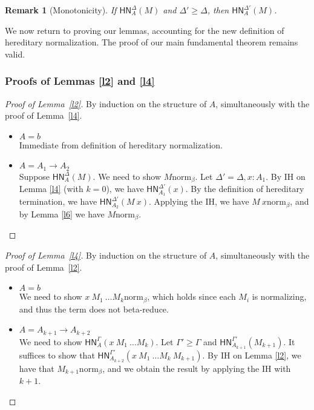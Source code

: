 \documentclass{article}
\newtheorem{remark}[thm]{Remark}
\newcommand{\bnorm}[1]{\ensuremath{#1 \mathrel{\text{norm}_\beta}}}
\newcommand{\hnorm}[3]{\ensuremath{\mathsf{HN}^{#1}_{#2}(#3)}}
\newcommand{\fn}[2]{\ensuremath{#1 \to #2}}
\newcommand{\ap}[2]{\ensuremath{#1\ #2}}
\begin{document}
\begin{remark}[Monotonicity]
If $\hnorm{\Delta}{A}{M}$ and $\Delta' \ge \Delta$, then $\hnorm{\Delta'}{A}{M}$.
\end{remark}

We now return to proving our lemmas, accounting for the new definition of hereditary
normalization.  The proof of our main fundamental theorem remains valid.

\subsubsection{Proofs of Lemmas \ref{l2} and \ref{l4}}

\begin{proof}[Proof of Lemma~\ref{l2}]
By induction on the structure of $A$, simultaneously with the proof of Lemma~\ref{l4}.
\begin{itemize}
  \setlength\itemsep{1em}
  \item $A = b$\\
  Immediate from definition of hereditary normalization.
  \item $A = \fn{A_1}{A_2}$\\
  Suppose $\hnorm{\Delta}{A}{M}$. We need to show $\bnorm{M}$. Let $\Delta' = \Delta, x : A_1$. By IH on Lemma \ref{l4} 
  (with $k = 0$), we have $\hnorm{\Delta'}{A_1}{x}$. By the definition of hereditary termination, we have 
  $\hnorm{\Delta'}{A_2}{\ap{M}{x}}$. Applying the IH, we have $\bnorm{\ap{M}{x}}$, and by Lemma \ref{l6} we have 
  $\bnorm{M}$. 
  \qedhere
\end{itemize}
\end{proof}

\begin{proof}[Proof of Lemma~\ref{l4}]
By induction on the structure of $A$, simultaneously with the proof of Lemma~\ref{l2}.
\begin{itemize}
  \setlength\itemsep{1em}
  \item $A = b$\\
  We need to show $\bnorm{\ap{\ap{x}{M_1}}{\dots M_k}}$, which holds since each $M_i$ is normalizing, and thus the 
  term does not beta-reduce.
  \item $A = \fn{A_{k+1}}{A_{k+2}}$\\
  We need to show $\hnorm{\Gamma}{A}{\ap{\ap{x}{M_1}}{\dots M_k}}$. Let $\Gamma' \ge \Gamma$ and 
  $\hnorm{\Gamma'}{A_{k+1}}{M_{k+1}}$. It suffices to show that 
  $\hnorm{\Gamma'}{A_{k+2}}{\ap{\ap{\ap{x}{M_1}}{\dots M_k}}{M_{k+1}}}$.
  By IH on Lemma \ref{l2}, we have that $\bnorm{M_{k+1}}$, and we obtain the result by applying the IH with $k + 1$.
\end{itemize}
\end{proof}
\end{document}
